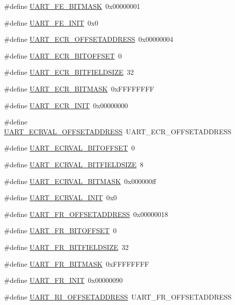 \begin{DoxyCompactItemize}
\item 
\#define \hyperlink{a00575_aed92d2e7fc1f8fcf6d015e6c04626b89}{UART\_\-FE\_\-BITMASK}~0x00000001
\item 
\#define \hyperlink{a00575_aef19bed93117e4bd3f5a657b8ded937c}{UART\_\-FE\_\-INIT}~0x0
\item 
\#define \hyperlink{a00575_a77e28c8e5a882bc8120f735dbe755af4}{UART\_\-ECR\_\-OFFSETADDRESS}~0x00000004
\item 
\#define \hyperlink{a00575_affc3cdf05a26fd7534800a4f909fbff0}{UART\_\-ECR\_\-BITOFFSET}~0
\item 
\#define \hyperlink{a00575_a7e597e39646f4e823cc8bba76517b6f9}{UART\_\-ECR\_\-BITFIELDSIZE}~32
\item 
\#define \hyperlink{a00575_a6771ebc21f3c184d092d51225a3b248a}{UART\_\-ECR\_\-BITMASK}~0xFFFFFFFF
\item 
\#define \hyperlink{a00575_a7184ccf2c6b3af3673199f409ee645e5}{UART\_\-ECR\_\-INIT}~0x00000000
\item 
\#define \hyperlink{a00575_aac92bcfaf3ccdf72b0fe7630ad171f78}{UART\_\-ECRVAL\_\-OFFSETADDRESS}~UART\_\-ECR\_\-OFFSETADDRESS
\item 
\#define \hyperlink{a00575_ac9a534cc01ab594dee0981a299ea6d43}{UART\_\-ECRVAL\_\-BITOFFSET}~0
\item 
\#define \hyperlink{a00575_adb6ad442239c39503816628d672a76e8}{UART\_\-ECRVAL\_\-BITFIELDSIZE}~8
\item 
\#define \hyperlink{a00575_aa7cc5139d083aed00faf9eff3d848b22}{UART\_\-ECRVAL\_\-BITMASK}~0x000000ff
\item 
\#define \hyperlink{a00575_a4e6eaa8cdd0674bf1f04d7d744c3cbdc}{UART\_\-ECRVAL\_\-INIT}~0x0
\item 
\#define \hyperlink{a00575_a4cd9e10816a9a02db35d0300d3774d84}{UART\_\-FR\_\-OFFSETADDRESS}~0x00000018
\item 
\#define \hyperlink{a00575_af504809da9908a397495515caa316d25}{UART\_\-FR\_\-BITOFFSET}~0
\item 
\#define \hyperlink{a00575_a6786737624ed6ad87a37bca8bea6e57a}{UART\_\-FR\_\-BITFIELDSIZE}~32
\item 
\#define \hyperlink{a00575_a0ab3f7e6d7f957865b19a3fa54359b49}{UART\_\-FR\_\-BITMASK}~0xFFFFFFFF
\item 
\#define \hyperlink{a00575_ac31d3f40c35da7b202886e09c2d7c368}{UART\_\-FR\_\-INIT}~0x00000090
\item 
\#define \hyperlink{a00575_a4c3fcf61de69f09603382161109f5fd8}{UART\_\-RI\_\-OFFSETADDRESS}~UART\_\-FR\_\-OFFSETADDRESS

\end{DoxyCompactItemize}
